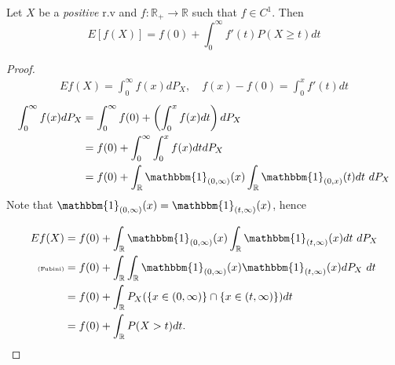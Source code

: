 \begin{corollary}
	Let $X$ be a \textit{positive} r.v and $f:\mathbb R_+ \to \mathbb R$ such that $f \in C^1$.
	Then
	\begin{equation}
		E[f(X)] = f(0) + \int_0^\infty f'(t) P(X \geq t) dt
		\label{eq:tailexpectationfunction}
	\end{equation}
\end{corollary}


\begin{proof}
	\begin{align*}
		Ef(X) =
		\int_0^\infty f(x) dP_X,
		\quad f(x) - f(0) = \int_0^x f'(t) dt
	\end{align*}
	\begin{align*}
		\int_0^\infty f(x) dP_X & =
		\int_0^\infty f(0) +
		\left(
		\int_0^x f(x) dt
		\right) dP_X                \\
		                        & =
		f(0) +
		\int_0^\infty
		\int_0^x f(x) dt
		dP_X                        \\
		                        & =
		f(0) +
		\int_\mathbb R \mathbbm{1}_{(0,\infty)}(x)
		\int_\mathbb R \mathbbm{1}_{(0,x)}(t)
		dt \ dP_X
		\\
	\end{align*}
	Note that $\mathbbm{1}_{(0,\infty)}(x) = \mathbbm{1}_{(t,\infty)}(x)$, hence

	\begin{align*}
		E f(X)                 & =
		f(0) +
		\int_\mathbb R \mathbbm{1}_{(0,\infty)}(x)
		\int_\mathbb R \mathbbm{1}_{(t,\infty)}(x) dt \ dP_X
		\\
		{\text{\tiny(Fubini)}} & =
		f(0) +
		\int_\mathbb R \int_\mathbb R \mathbbm{1}_{(0,\infty)}(x)
		\mathbbm{1}_{(t,\infty)}(x) dP_X \ dt                                \\
		                       & =
		f(0) +
		\int_\mathbb R P_X(\{x \in (0,\infty)\} \cap \{x \in (t,\infty)\})dt \\
		                       & =
		f(0) +
		\int_\mathbb R P(X > t)dt.
	\end{align*}
\end{proof}
